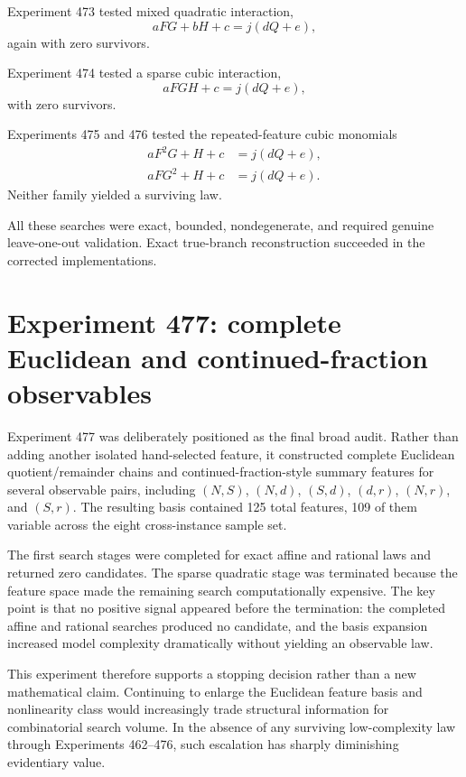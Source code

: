 \documentclass[11pt,a4paper]{article}
\begin{document}
Experiment 473 tested mixed quadratic interaction,
\begin{equation}
aFG+bH+c=j(dQ+e),
\end{equation}
again with zero survivors.

Experiment 474 tested a sparse cubic interaction,
\begin{equation}
aFGH+c=j(dQ+e),
\end{equation}
with zero survivors.

Experiments 475 and 476 tested the repeated-feature cubic monomials
\begin{align}
aF^2G+H+c&=j(dQ+e),\\
aFG^2+H+c&=j(dQ+e).
\end{align}
Neither family yielded a surviving law.

All these searches were exact, bounded, nondegenerate, and required genuine leave-one-out validation. Exact true-branch reconstruction succeeded in the corrected implementations.

\section{Experiment 477: complete Euclidean and continued-fraction observables}

Experiment 477 was deliberately positioned as the final broad audit. Rather than adding another isolated hand-selected feature, it constructed complete Euclidean quotient/remainder chains and continued-fraction-style summary features for several observable pairs, including $(N,S)$, $(N,d)$, $(S,d)$, $(d,r)$, $(N,r)$, and $(S,r)$. The resulting basis contained 125 total features, 109 of them variable across the eight cross-instance sample set.

The first search stages were completed for exact affine and rational laws and returned zero candidates. The sparse quadratic stage was terminated because the feature space made the remaining search computationally expensive. The key point is that no positive signal appeared before the termination: the completed affine and rational searches produced no candidate, and the basis expansion increased model complexity dramatically without yielding an observable law.

This experiment therefore supports a stopping decision rather than a new mathematical claim. Continuing to enlarge the Euclidean feature basis and nonlinearity class would increasingly trade structural information for combinatorial search volume. In the absence of any surviving low-complexity law through Experiments 462--476, such escalation has sharply diminishing evidentiary value.
\end{document}
